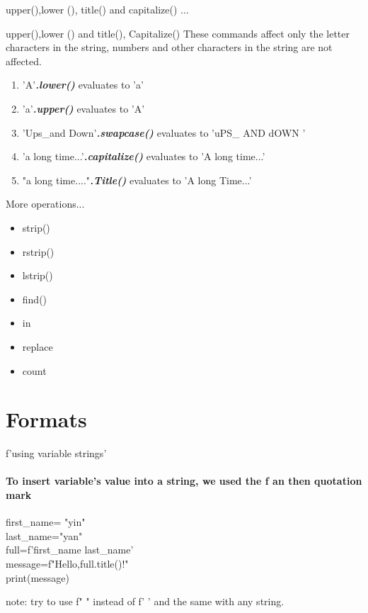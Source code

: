 \documentclass[aspectratio=169,19pt,english]{beamer}
\begin{document}
{\begin{frame}{upper(),lower (), title() and capitalize() ...}
		\end{frame}
		\begin{frame}{upper(),lower () and title(), Capitalize()}
			These commands affect only the letter characters in the string, numbers and other characters in the string are not affected. 
			\begin{enumerate}[label=\arabic*.-]
				\item 'A'\textit{\textbf{.lower()}} evaluates to 'a'
				\item 'a'\textit{\textbf{.upper()}} evaluates to 'A'
				\item 'Ups\_and Down'\textbf{\textit{.swapcase()}} evaluates to 'uPS\_ AND dOWN '
				\item 'a long time...'\textbf{\textit{.capitalize()}} evaluates to 'A long time...'
				\item "a long time...."\textbf{\textit{.Title()}} evaluates to 'A long Time...'
			\end{enumerate}
		\end{frame}
		\begin{frame}{More operations...}
			\begin{itemize}
				\item[*] strip()
				\item[*] rstrip()
				\item[*] lstrip()
				\item[*] find()
				\item[*] in
				\item[*] replace
				\item[*] count
			\end{itemize}
		\end{frame}
		\section{Formats}
		\begin{frame}{f'using variable strings'}
		\framesubtitle{To insert variable's value into a string, we used the f an then quotation mark}
		\begin{center}
			
		
		first\_name= "yin"\\
		last\_name="yan"\\
		full=f'{first\_name} {last\_name}'\\
		message=f"Hello,{full.title()}!"\\
		print(message) 
	\end{center}
		note: try to use f" " instead of f' ' and the same with any string.


\end{frame}}
\end{document}
